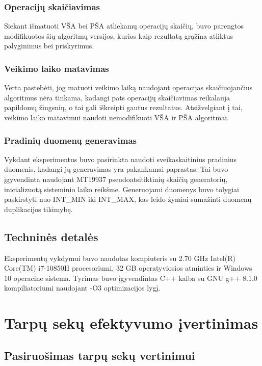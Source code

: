 \documentclass{VUMIFInfKursinis}
\begin{document}
\subsubsection{Operacijų skaičiavimas}

Siekant išmatuoti VŠA bei PŠA atliekamų operacijų skaičių,
buvo parengtos modifikuotos šių algoritmų versijos, kurios kaip rezultatą grąžina atliktus palyginimus bei priskyrimus.

\subsubsection{Veikimo laiko matavimas}

Verta pastebėti, jog matuoti veikimo laiką naudojant operacijas skaičiuojančius algoritmus nėra tinkama,
kadangi pats operacijų skaičiavimas reikalauja papildomų žingsnių, o tai gali iškreipti gautus rezultatus.
Atsižvelgiant į tai, veikimo laiko matavimui naudoti nemodifikuoti VŠA ir PŠA algoritmai. 

\subsubsection{Pradinių duomenų generavimas}

Vykdant eksperimentus buvo pasirinkta naudoti sveikaskaitinius pradinius duomenis, kadangi jų generavimas yra pakankamai paprastas.
Tai buvo įgyvendinta naudojant MT19937 pseudoatsitiktinių skaičių generatorių, inicializuotą sisteminio laiko reikšme.
Generuojami duomenys buvo tolygiai paskirstyti nuo INT\_MIN iki INT\_MAX, kas leido žymiai sumažinti duomenų duplikacijos tikimybę.

\subsection{Techninės detalės}
Eksperimentų vykdymui buvo naudotas kompiuteris su 2.70 GHz Intel(R) Core(TM) i7-10850H procesoriumi,
32 GB operatyviosios atminties ir Windows 10 operacine sistema.
Tyrimas buvo įgyvendintas C++ kalba su GNU g++ 8.1.0 kompiliatoriumi naudojant -O3 optimizacijos lygį.

\section{Tarpų sekų efektyvumo įvertinimas}

\subsection{Pasiruošimas tarpų sekų vertinimui}
\end{document}
